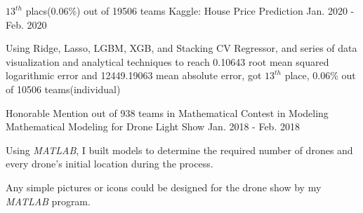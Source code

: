

\begin{cventries}
  \cventry
    {$13^{th}$ placs(0.06\%) out of 19506 teams} %
    {Kaggle: House Price Prediction} %
    {} %
    {Jan. 2020 - Feb. 2020} %
    {
      \begin{cvitems} %
        \item {Using Ridge, Lasso, LGBM, XGB, and Stacking CV Regressor, and series of data visualization and analytical techniques to reach 0.10643 root mean squared logarithmic error and 12449.19063 mean absolute error, got $13^{th}$ place, 0.06\% out of 10506 teams(individual)}
      \end{cvitems}
    }

  

  \cventry
    {Honorable Mention out of 938 teams in Mathematical Contest in Modeling} %
    {Mathematical Modeling for Drone Light Show} %
    {} %
    {Jan. 2018 - Feb. 2018} %
    {
      \begin{cvitems} %
        \item {Using \textit{MATLAB}, I built models to determine the required number of drones and every drone’s initial location during the process.}
        \item {Any simple pictures or icons could be designed for the drone show by my \textit{MATLAB} program.}
      \end{cvitems}
    }


\end{cventries}
